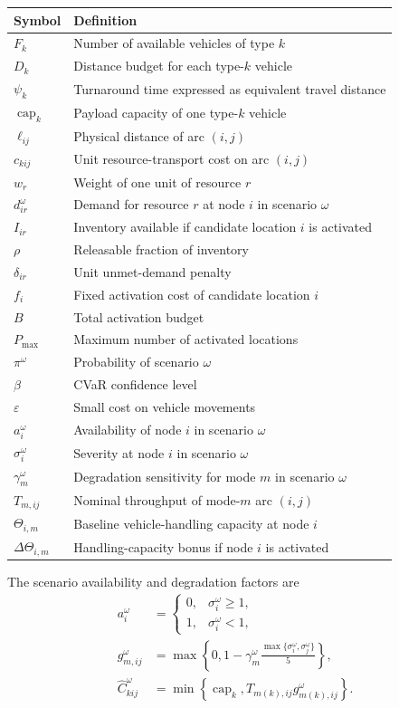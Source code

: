 \documentclass[11pt]{article}
\begin{document}
\begin{tabular}{ll}
\toprule
Symbol & Definition \\
\midrule
$F_k$ & Number of available vehicles of type $k$ \\
$D_k$ & Distance budget for each type-$k$ vehicle \\
$\psi_k$ & Turnaround time expressed as equivalent travel distance \\
$\operatorname{cap}_k$ & Payload capacity of one type-$k$ vehicle \\
$\ell_{ij}$ & Physical distance of arc $(i,j)$ \\
$c_{kij}$ & Unit resource-transport cost on arc $(i,j)$ \\
$w_r$ & Weight of one unit of resource $r$ \\
$d^\omega_{ir}$ & Demand for resource $r$ at node $i$ in scenario $\omega$ \\
$I_{ir}$ & Inventory available if candidate location $i$ is activated \\
$\rho$ & Releasable fraction of inventory \\
$\delta_{ir}$ & Unit unmet-demand penalty \\
$f_i$ & Fixed activation cost of candidate location $i$ \\
$B$ & Total activation budget \\
$P_{\max}$ & Maximum number of activated locations \\
$\pi^\omega$ & Probability of scenario $\omega$ \\
$\beta$ & CVaR confidence level \\
$\varepsilon$ & Small cost on vehicle movements \\
$a^\omega_i$ & Availability of node $i$ in scenario $\omega$ \\
$\sigma^\omega_i$ & Severity at node $i$ in scenario $\omega$ \\
$\gamma^\omega_m$ & Degradation sensitivity for mode $m$ in scenario $\omega$ \\
$T_{m,ij}$ & Nominal throughput of mode-$m$ arc $(i,j)$ \\
$\Theta_{i,m}$ & Baseline vehicle-handling capacity at node $i$ \\
$\Delta\Theta_{i,m}$ & Handling-capacity bonus if node $i$ is activated \\
\bottomrule
\end{tabular}

The scenario availability and degradation factors are
\begin{align}
a^\omega_i
&=
\begin{cases}
0, & \sigma^\omega_i\geq 1,\\
1, & \sigma^\omega_i<1,
\end{cases}
\label{eq:availability}\\
g^\omega_{m,ij}
&=
\max\left\{0,
1-\gamma^\omega_m
\frac{\max\{\sigma^\omega_i,\sigma^\omega_j\}}{5}
\right\},
\label{eq:arc-degradation}\\
\widehat C^\omega_{kij}
&=
\min\left\{
\operatorname{cap}_k,
T_{m(k),ij}g^\omega_{m(k),ij}
\right\}.
\label{eq:usable-capacity}
\end{align}
\end{document}
